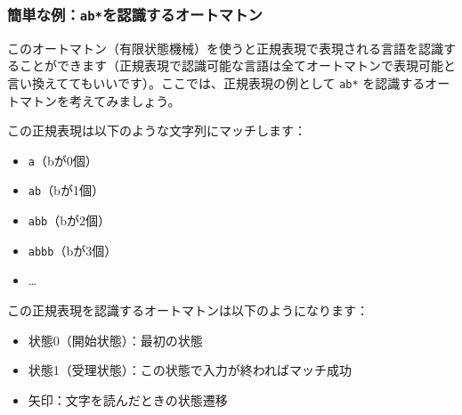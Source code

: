 \hypertarget{chapter4-ux7c21ux5358ux306aux4f8babux3092ux8a8dux8b58ux3059ux308bux30aaux30fcux30c8ux30deux30c8ux30f3}{%
\subsubsection{\texorpdfstring{簡単な例：\texttt{ab*}を認識するオートマトン}{簡単な例：ab*を認識するオートマトン}}\label{chapter4-ux7c21ux5358ux306aux4f8babux3092ux8a8dux8b58ux3059ux308bux30aaux30fcux30c8ux30deux30c8ux30f3}}

このオートマトン（有限状態機械）を使うと正規表現で表現される言語を認識することができます（正規表現で認識可能な言語は全てオートマトンで表現可能と言い換えててもいいです）。ここでは、正規表現の例として
\texttt{ab*} を認識するオートマトンを考えてみましょう。

この正規表現は以下のような文字列にマッチします：

\begin{itemize}
\tightlist
\item
  \texttt{a}（bが0個）
\item
  \texttt{ab}（bが1個）\\
\item
  \texttt{abb}（bが2個）
\item
  \texttt{abbb}（bが3個）
\item
  \ldots{}
\end{itemize}

この正規表現を認識するオートマトンは以下のようになります：

\begin{center}
\end{center}

\begin{itemize}
\tightlist
\item
  状態0（開始状態）：最初の状態
\item
  状態1（受理状態）：この状態で入力が終わればマッチ成功
\item
  矢印：文字を読んだときの状態遷移
\end{itemize}

